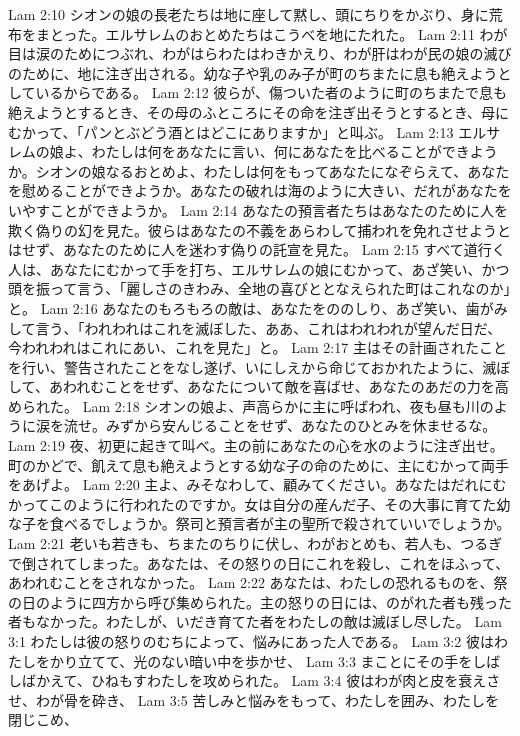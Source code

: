 Lam 2:10  シオンの娘の長老たちは地に座して黙し、頭にちりをかぶり、身に荒布をまとった。エルサレムのおとめたちはこうべを地にたれた。
Lam 2:11  わが目は涙のためにつぶれ、わがはらわたはわきかえり、わが肝はわが民の娘の滅びのために、地に注ぎ出される。幼な子や乳のみ子が町のちまたに息も絶えようとしているからである。
Lam 2:12  彼らが、傷ついた者のように町のちまたで息も絶えようとするとき、その母のふところにその命を注ぎ出そうとするとき、母にむかって、「パンとぶどう酒とはどこにありますか」と叫ぶ。
Lam 2:13  エルサレムの娘よ、わたしは何をあなたに言い、何にあなたを比べることができようか。シオンの娘なるおとめよ、わたしは何をもってあなたになぞらえて、あなたを慰めることができようか。あなたの破れは海のように大きい、だれがあなたをいやすことができようか。
Lam 2:14  あなたの預言者たちはあなたのために人を欺く偽りの幻を見た。彼らはあなたの不義をあらわして捕われを免れさせようとはせず、あなたのために人を迷わす偽りの託宣を見た。
Lam 2:15  すべて道行く人は、あなたにむかって手を打ち、エルサレムの娘にむかって、あざ笑い、かつ頭を振って言う、「麗しさのきわみ、全地の喜びととなえられた町はこれなのか」と。
Lam 2:16  あなたのもろもろの敵は、あなたをののしり、あざ笑い、歯がみして言う、「われわれはこれを滅ぼした、ああ、これはわれわれが望んだ日だ、今われわれはこれにあい、これを見た」と。
Lam 2:17  主はその計画されたことを行い、警告されたことをなし遂げ、いにしえから命じておかれたように、滅ぼして、あわれむことをせず、あなたについて敵を喜ばせ、あなたのあだの力を高められた。
Lam 2:18  シオンの娘よ、声高らかに主に呼ばわれ、夜も昼も川のように涙を流せ。みずから安んじることをせず、あなたのひとみを休ませるな。
Lam 2:19  夜、初更に起きて叫べ。主の前にあなたの心を水のように注ぎ出せ。町のかどで、飢えて息も絶えようとする幼な子の命のために、主にむかって両手をあげよ。
Lam 2:20  主よ、みそなわして、顧みてください。あなたはだれにむかってこのように行われたのですか。女は自分の産んだ子、その大事に育てた幼な子を食べるでしょうか。祭司と預言者が主の聖所で殺されていいでしょうか。
Lam 2:21  老いも若きも、ちまたのちりに伏し、わがおとめも、若人も、つるぎで倒されてしまった。あなたは、その怒りの日にこれを殺し、これをほふって、あわれむことをされなかった。
Lam 2:22  あなたは、わたしの恐れるものを、祭の日のように四方から呼び集められた。主の怒りの日には、のがれた者も残った者もなかった。わたしが、いだき育てた者をわたしの敵は滅ぼし尽した。
Lam 3:1  わたしは彼の怒りのむちによって、悩みにあった人である。
Lam 3:2  彼はわたしをかり立てて、光のない暗い中を歩かせ、
Lam 3:3  まことにその手をしばしばかえて、ひねもすわたしを攻められた。
Lam 3:4  彼はわが肉と皮を衰えさせ、わが骨を砕き、
Lam 3:5  苦しみと悩みをもって、わたしを囲み、わたしを閉じこめ、
